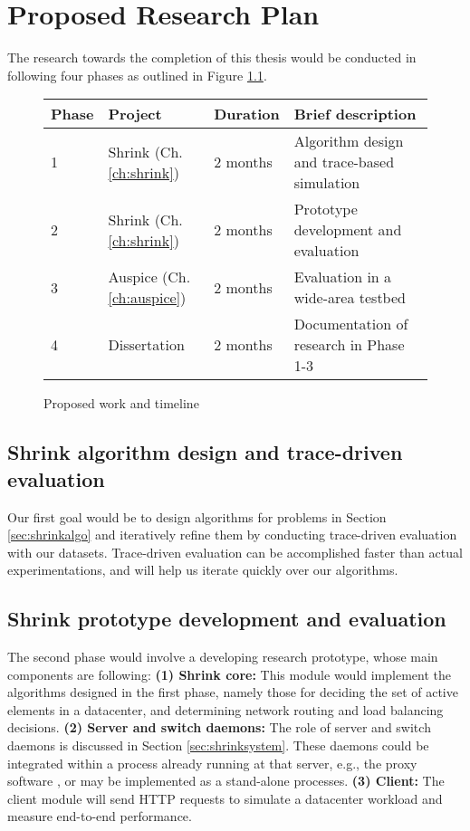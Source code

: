 \chapter{Proposed Research Plan}
\label{ch:proposed}
The research towards the completion of this thesis would be conducted in following four phases as outlined in Figure \ref{fig:proposal}.
\begin{figure}[h]
\centering
{\small
\begin{tabular}{| l | l | l | l |}
  \hline                       
  \textbf{Phase} &   \textbf{Project}   &   \textbf{Duration} &   \textbf{Brief description}\\
  \hline                       
  1 & Shrink (Ch. \ref{ch:shrink}) & 2 months & Algorithm design and trace-based simulation \\
    \hline                       
  2 & Shrink (Ch. \ref{ch:shrink}) & 2 months & Prototype development and evaluation\\
    \hline                       
  3 & Auspice (Ch. \ref{ch:auspice}) & 2 months & Evaluation in a wide-area testbed\\
    \hline                       
  4 & Dissertation & 2 months & Documentation of research in Phase 1-3 \\  
  \hline  
\end{tabular}
}
\caption{Proposed work and timeline}
\label{fig:proposal}
\end{figure}

\section{Shrink algorithm design and trace-driven evaluation} Our first goal would be to design algorithms for problems in Section \ref{sec:shrinkalgo} and iteratively refine them by conducting trace-driven evaluation with our datasets. Trace-driven evaluation can be accomplished faster than actual experimentations, and will help us iterate quickly over our algorithms.

\section{Shrink prototype development and evaluation} 
The second phase would involve a developing research prototype, whose main components are following: \textbf{(1) Shrink core:} This module would implement the algorithms designed in the first phase, namely those for deciding the set of active elements in a datacenter, and determining network routing and load balancing decisions.  \textbf{(2) Server and switch daemons:} The role of server and switch daemons is discussed in Section \ref{sec:shrinksystem}. These daemons could be integrated within a process already running at that server, e.g., the proxy software \cite{squid}, or may be implemented as a stand-alone processes.  \textbf{(3) Client:} The client module will send HTTP requests to simulate a datacenter workload and measure end-to-end performance.

